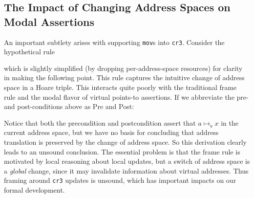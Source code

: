 \subsection{The Impact of Changing Address Spaces on Modal Assertions}
\label{sec:issues}
An important subtlety arises with supporting \lstinline|mov|s into \lstinline|cr3|. Consider the hypothetical rule
\begin{mathpar}
\end{mathpar}
which is slightly simplified (by dropping per-address-space resources) for clarity in making the following point.
This rule captures the intuitive change of address space in a Hoare triple.
This interacts quite poorly with the traditional frame
rule and the modal flavor of virtual points-to assertions.
If we abbreviate the pre- and post-conditions above as \textsf{Pre} and \textsf{Post}:
\begin{mathpar}
\end{mathpar}
Notice that both the precondition and postcondition assert that $a\mapsto_\mathsf{v} x$ in the current address space, but we have no basis for concluding that address translation is preserved by the change of address space. So this derivation clearly leads to an unsound conclusion. 
The essential problem is that the frame rule is motivated by local reasoning about local updates, but
a switch of address space is a \emph{global} change, since it may invalidate information about virtual addresses.
Thus framing around \lstinline|cr3| updates is unsound, which has important impacts on our formal development.

